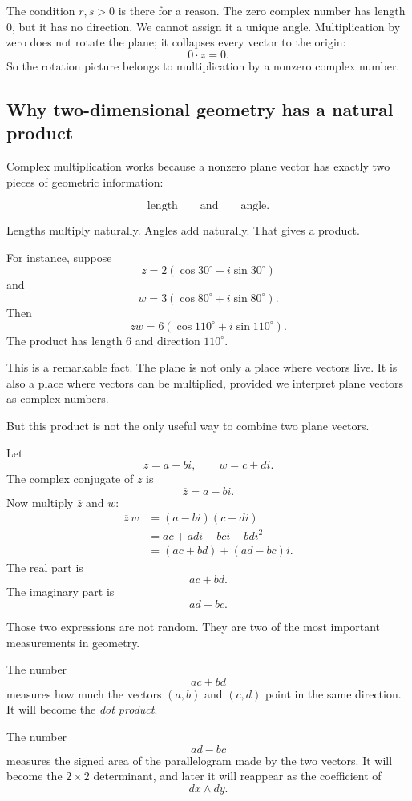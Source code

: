 The condition \(r,s>0\) is there for a reason.  The zero complex number has length
\(0\), but it has no direction.  We cannot assign it a unique angle.  Multiplication by
zero does not rotate the plane; it collapses every vector to the origin:
\[
    0\cdot z=0.
\]
So the rotation picture belongs to multiplication by a nonzero complex number.

\subsection{Why two-dimensional geometry has a natural product}

Complex multiplication works because a nonzero plane vector has exactly two pieces of
geometric information:

\[
    \text{length}
    \qquad\text{and}\qquad
    \text{angle}.
\]

Lengths multiply naturally.  Angles add naturally.  That gives a product.

For instance, suppose
\[
    z=2(\cos 30^\circ+i\sin30^\circ)
\]
and
\[
    w=3(\cos 80^\circ+i\sin80^\circ).
\]
Then
\[
    zw
    =
    6(\cos110^\circ+i\sin110^\circ).
\]
The product has length \(6\) and direction \(110^\circ\).

This is a remarkable fact.  The plane is not only a place where vectors live.  It is also a
place where vectors can be multiplied, provided we interpret plane vectors as complex
numbers.

But this product is not the only useful way to combine two plane vectors.

Let
\[
    z=a+bi,\qquad w=c+di.
\]
The complex conjugate of \(z\) is
\[
    \overline z=a-bi.
\]
Now multiply \(\overline z\) and \(w\):
\[
\begin{aligned}
    \overline z\,w
    &=(a-bi)(c+di)\\
    &=ac+adi-bci-bdi^2\\
    &=(ac+bd)+(ad-bc)i.
\end{aligned}
\]
The real part is
\[
    ac+bd.
\]
The imaginary part is
\[
    ad-bc.
\]

Those two expressions are not random.  They are two of the most important measurements
in geometry.

The number
\[
    ac+bd
\]
measures how much the vectors \((a,b)\) and \((c,d)\) point in the same direction.
It will become the \emph{dot product}.

The number
\[
    ad-bc
\]
measures the signed area of the parallelogram made by the two vectors.  It will become
the \(2\times2\) determinant, and later it will reappear as the coefficient of
\[
    dx\wedge dy.
\]

